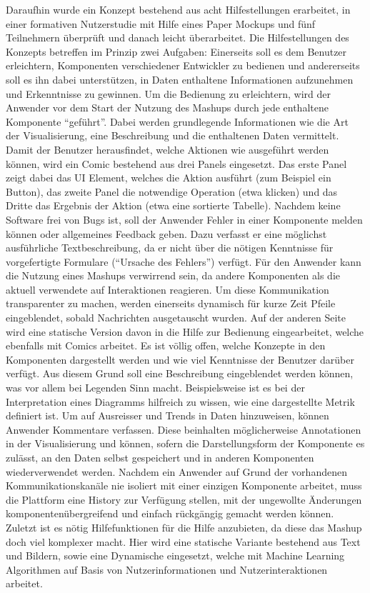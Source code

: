 \documentclass[
	headsepline,
	footsepline,
	fontsize=12pt,
	bibliography=totoc
]{scrbook}
\begin{document}
Daraufhin wurde ein Konzept bestehend aus acht Hilfestellungen erarbeitet, in einer formativen Nutzerstudie mit Hilfe eines Paper Mockups und fünf Teilnehmern überprüft und danach leicht überarbeitet. Die Hilfestellungen des Konzepts betreffen im Prinzip zwei Aufgaben: Einerseits soll es dem Benutzer erleichtern, Komponenten verschiedener Entwickler zu bedienen und andererseits soll es ihn dabei unterstützen, in Daten enthaltene Informationen aufzunehmen und Erkenntnisse zu gewinnen. Um die Bedienung zu erleichtern, wird der Anwender vor dem Start der Nutzung des Mashups durch jede enthaltene Komponente \enquote{geführt}. Dabei werden grundlegende Informationen wie die Art der Visualisierung, eine Beschreibung und die enthaltenen Daten vermittelt. Damit der Benutzer herausfindet, welche Aktionen wie ausgeführt werden können, wird ein Comic bestehend aus drei Panels eingesetzt. Das erste Panel zeigt dabei das UI Element, welches die Aktion ausführt (zum Beispiel ein Button), das zweite Panel die notwendige Operation (etwa klicken) und das Dritte das Ergebnis der Aktion (etwa eine sortierte Tabelle). Nachdem keine Software frei von Bugs ist, soll der Anwender Fehler in einer Komponente melden können oder allgemeines Feedback geben. Dazu verfasst er eine möglichst ausführliche Textbeschreibung, da er nicht über die nötigen Kenntnisse für vorgefertigte Formulare (\enquote{Ursache des Fehlers}) verfügt. Für den Anwender kann die Nutzung eines Mashups verwirrend sein, da andere Komponenten als die aktuell verwendete auf Interaktionen reagieren. Um diese Kommunikation transparenter zu machen, werden einerseits dynamisch für kurze Zeit Pfeile eingeblendet, sobald Nachrichten ausgetauscht wurden. Auf der anderen Seite wird eine statische Version davon in die Hilfe zur Bedienung eingearbeitet, welche ebenfalls mit Comics arbeitet. Es ist völlig offen, welche Konzepte in den Komponenten dargestellt werden und wie viel Kenntnisse der Benutzer darüber verfügt. Aus diesem Grund soll eine Beschreibung eingeblendet werden können, was vor allem bei Legenden Sinn macht. Beispielsweise ist es bei der Interpretation eines Diagramms hilfreich zu wissen, wie eine dargestellte Metrik definiert ist. Um auf Ausreisser und Trends in Daten hinzuweisen, können Anwender Kommentare verfassen. Diese beinhalten möglicherweise Annotationen in der Visualisierung und können, sofern die Darstellungsform der Komponente es zulässt, an den Daten selbst gespeichert und in anderen Komponenten wiederverwendet werden. Nachdem ein Anwender auf Grund der vorhandenen Kommunikationskanäle nie isoliert mit einer einzigen Komponente arbeitet, muss die Plattform eine History zur Verfügung stellen, mit der ungewollte Änderungen komponentenübergreifend und einfach rückgängig gemacht werden können. Zuletzt ist es nötig Hilfefunktionen für die Hilfe anzubieten, da diese das Mashup doch viel komplexer macht. Hier wird eine statische Variante bestehend aus Text und Bildern, sowie eine Dynamische eingesetzt, welche mit Machine Learning Algorithmen auf Basis von Nutzerinformationen und Nutzerinteraktionen arbeitet.
\end{document}
